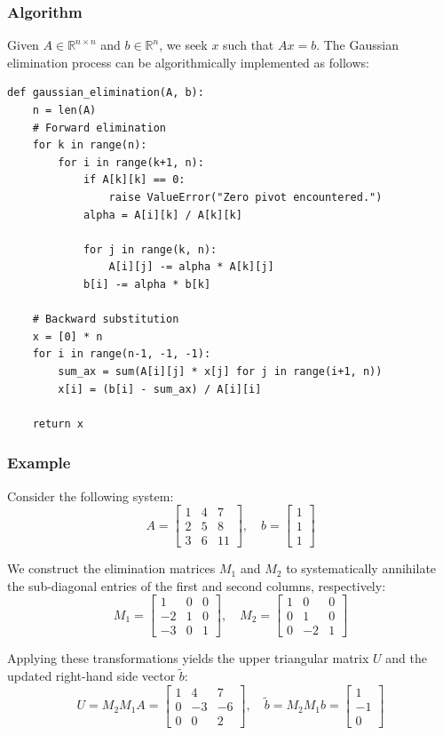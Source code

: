 \documentclass[12pt, a4paper]{article}
\theoremstyle{break}
\begin{document}
\subsubsection*{Algorithm}
Given $A \in \mathbb{R}^{n \times n}$ and $b \in \mathbb{R}^n$, we seek $x$ such that $Ax = b$.
The Gaussian elimination process can be algorithmically implemented as follows:
\begin{lstlisting}
def gaussian_elimination(A, b):
    n = len(A)
    # Forward elimination
    for k in range(n):
        for i in range(k+1, n):
            if A[k][k] == 0:
                raise ValueError("Zero pivot encountered.")
            alpha = A[i][k] / A[k][k]
        
            for j in range(k, n):
                A[i][j] -= alpha * A[k][j]
            b[i] -= alpha * b[k]

    # Backward substitution
    x = [0] * n
    for i in range(n-1, -1, -1):
        sum_ax = sum(A[i][j] * x[j] for j in range(i+1, n))
        x[i] = (b[i] - sum_ax) / A[i][i]

    return x
\end{lstlisting}

\subsubsection*{Example}
Consider the following system:
\[
A = \begin{bmatrix}
1 & 4 & 7 \\
2 & 5 & 8 \\
3 & 6 & 11
\end{bmatrix}, \quad
b = \begin{bmatrix}
1 \\ 1 \\ 1
\end{bmatrix}
\]

We construct the elimination matrices $M_1$ and $M_2$ to systematically annihilate the sub-diagonal entries of the first and second columns, respectively:
\[
M_1 = \begin{bmatrix}
1 & 0 & 0 \\
-2 & 1 & 0 \\
-3 & 0 & 1
\end{bmatrix}, \quad
M_2 = \begin{bmatrix}
1 & 0 & 0 \\
0 & 1 & 0 \\
0 & -2 & 1
\end{bmatrix}
\]

Applying these transformations yields the upper triangular matrix $U$ and 
the updated right-hand side vector $\tilde{b}$:
\[
U = M_2 M_1 A = \begin{bmatrix}
1 & 4 & 7 \\
0 & -3 & -6 \\
0 & 0 & 2
\end{bmatrix}, \quad
\tilde{b} = M_2 M_1 b = \begin{bmatrix}
1 \\ -1 \\ 0
\end{bmatrix}
\]
\end{document}
